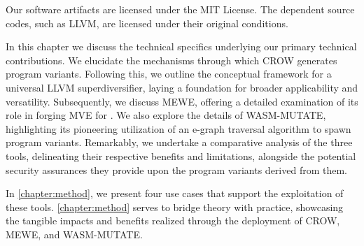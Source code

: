 Our software artifacts are licensed under the MIT License. The dependent source codes, such as LLVM, are licensed under their original conditions.


In this chapter we discuss the technical specifics underlying our primary technical contributions.
We elucidate the mechanisms through which CROW generates program variants.
Following this, we outline the conceptual framework for a universal LLVM superdiversifier, laying a foundation for broader applicability and versatility.
Subsequently, we discuss MEWE, offering a detailed examination of its role in forging MVE for \Wasm. 
We also explore the details of WASM-MUTATE, highlighting its pioneering utilization of an e-graph traversal algorithm to spawn \wasm program variants. 
Remarkably, we undertake a comparative analysis of the three tools, delineating their respective benefits and limitations, alongside the potential security assurances they provide upon the program variants derived from them. 

In \autoref{chapter:method}, we present four use cases that support the exploitation of these tools.
\autoref{chapter:method} serves to bridge theory with practice, showcasing the tangible impacts and benefits realized through the deployment of CROW, MEWE, and WASM-MUTATE.
